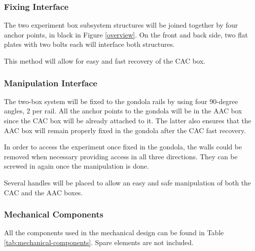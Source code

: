 

\subsubsection{Fixing Interface}

The two experiment box subsystem structures will be joined together by four anchor points, in black in Figure \ref{overview}. On the front and back side, two flat plates with two bolts each will interface both structures. 

This method will allow for easy and fast recovery of the CAC box. 
 



\subsubsection{Manipulation Interface}

The two-box system will be fixed to the gondola rails by using four 90-degree angles, 2 per rail. All the anchor points to the gondola will be in the AAC box since the CAC box will be already attached to it. The latter also ensures that the AAC box will remain properly fixed in the gondola after the CAC fast recovery. 

\smallskip
In order to access the experiment once fixed in the gondola, the walls could be removed when necessary providing access in all three directions. They can be screwed in again once the manipulation is done.


Several handles will be placed to allow an easy and safe manipulation of both the CAC and the AAC boxes. 


\subsubsection{Mechanical Components}

All the components used in the mechanical design can be found in Table \ref{tab:mechanical-components}. Spare elements are not included. 


\raggedbottom